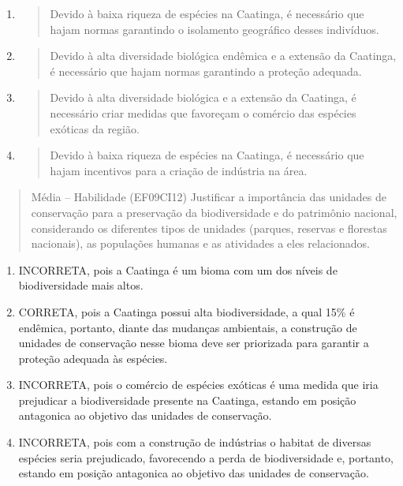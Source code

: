 \begin{enumerate}
\def\labelenumi{(\Alph{enumi})}
\item
  \begin{quote}
  Devido à baixa riqueza de espécies na Caatinga, é necessário que hajam
  normas garantindo o isolamento geográfico desses indivíduos.
  \end{quote}
\item
  \begin{quote}
  Devido à alta diversidade biológica endêmica e a extensão da Caatinga,
  é necessário que hajam normas garantindo a proteção adequada.
  \end{quote}
\item
  \begin{quote}
  Devido à alta diversidade biológica e a extensão da Caatinga, é
  necessário criar medidas que favoreçam o comércio das espécies
  exóticas da região.
  \end{quote}
\item
  \begin{quote}
  Devido à baixa riqueza de espécies na Caatinga, é necessário que hajam
  incentivos para a criação de indústria na área.
  \end{quote}
\end{enumerate}

\begin{quote}
Média -- Habilidade (EF09CI12) Justificar a importância das unidades de
conservação para a preservação da biodiversidade e do patrimônio
nacional, considerando os diferentes tipos de unidades (parques,
reservas e florestas nacionais), as populações humanas e as atividades a
eles relacionados.
\end{quote}

\begin{enumerate}
\def\labelenumi{(\Alph{enumi})}
\item
  INCORRETA, pois a Caatinga é um bioma com um dos níveis de
  biodiversidade mais altos.
\item
  CORRETA, pois a Caatinga possui alta biodiversidade, a qual 15\% é
  endêmica, portanto, diante das mudanças ambientais, a construção de
  unidades de conservação nesse bioma deve ser priorizada para garantir
  a proteção adequada às espécies.
\item
  INCORRETA, pois o comércio de espécies exóticas é uma medida que iria
  prejudicar a biodiversidade presente na Caatinga, estando em posição
  antagonica ao objetivo das unidades de conservação.
\item
  INCORRETA, pois com a construção de indústrias o habitat de diversas
  espécies seria prejudicado, favorecendo a perda de biodiversidade e,
  portanto, estando em posição antagonica ao objetivo das unidades de
  conservação.
\end{enumerate}

